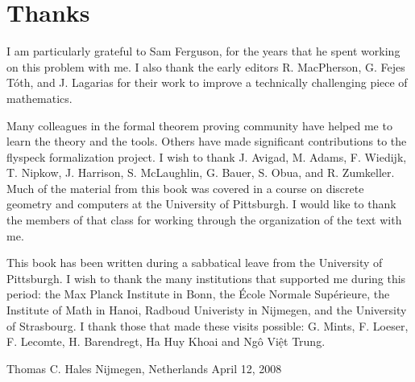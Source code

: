 









\section{Thanks}

I am particularly grateful to Sam Ferguson, for the years that
he spent working on this problem with me.  I also thank the early editors
R. MacPherson, G. Fejes T\'oth, and J. Lagarias for their work
to improve a technically challenging piece of mathematics.  

Many colleagues in the formal theorem proving community have helped me to learn the theory and the tools.  Others have made significant contributions to the flyspeck formalization project.  I wish to thank J. Avigad, M. Adams, F. Wiedijk,  T. Nipkow, J. Harrison, S. McLaughlin, G. Bauer, S. Obua, and R. Zumkeller.   Much of the material from this book was covered in a course on discrete geometry and computers at the University of Pittsburgh.  I would like to thank the members of that class for working through the organization of the text with me.

This book has been written during a sabbatical leave from the University
of Pittsburgh.  I wish to thank the many institutions that supported
me during this period: the Max Planck Institute in Bonn, the \'Ecole Normale Sup\'erieure,  the Institute of Math
in Hanoi, Radboud Univeristy in Nijmegen, and the University of Strasbourg.
I thank those that made these visits possible: G. Mints, F. Loeser, F. Lecomte, H. Barendregt, Ha Huy Khoai and Ng\^o Vi\d{\^e}t Trung.

\bigskip
\hbox{}

{
\parindent=0pt
\obeylines

Thomas C. Hales
Nijmegen, Netherlands
April 12, 2008

}







